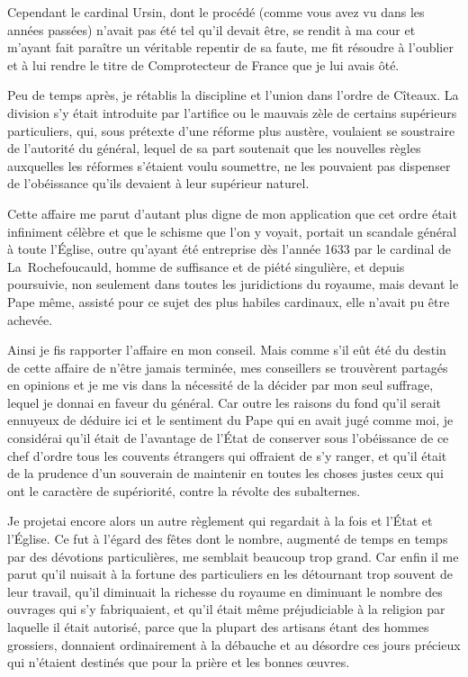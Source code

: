 \documentclass[french,twoside]{book} %
\begin{document}
Cependant le cardinal Ursin, dont le procédé (comme vous avez vu dans les années passées) n’avait pas été tel qu’il devait être, se rendit à ma cour et m’ayant fait paraître un véritable repentir de sa faute, me fit résoudre à l’oublier et à lui rendre le titre de Comprotecteur de France que je lui avais ôté.\par
Peu de temps après, je rétablis la discipline et l’union dans l’ordre de Cîteaux. La division s’y était introduite par l’artifice ou le mauvais zèle de certains supérieurs particuliers, qui, sous prétexte d’une réforme plus austère, voulaient se soustraire de l’autorité du général, lequel de sa part soutenait que les nouvelles règles auxquelles les réformes s’étaient voulu soumettre, ne les pouvaient pas dispenser de l’obéissance qu’ils devaient à leur supérieur naturel.\par
Cette affaire me parut d’autant plus digne de mon application que cet ordre était infiniment célèbre et que le schisme que l’on y voyait, portait un scandale général à toute l’Église, outre qu’ayant été entreprise dès l’année 1633 par le cardinal de La Rochefoucauld, homme de suffisance et de piété singulière, et depuis poursuivie, non seulement dans toutes les juridictions du royaume, mais devant le Pape même, assisté pour ce sujet des plus habiles cardinaux, elle n’avait pu être achevée.\par
Ainsi je fis rapporter l’affaire en mon conseil. Mais comme s’il eût été du destin de cette affaire de n’être jamais terminée, mes conseillers se trouvèrent partagés en opinions et je me vis dans la nécessité de la décider par mon seul suffrage, lequel je donnai en faveur du général. Car outre les raisons du fond qu’il serait ennuyeux de déduire ici et le sentiment du Pape qui en avait jugé comme moi, je considérai qu’il était de l’avantage de l’État de conserver sous l’obéissance de ce chef d’ordre tous les couvents étrangers qui offraient de s’y ranger, et qu’il était de la prudence d’un souverain de maintenir en toutes les choses justes ceux qui ont le caractère de supériorité, contre la révolte des subalternes.\par
Je projetai encore alors un autre règlement qui regardait à la fois et l’État et l’Église. Ce fut à l’égard des fêtes dont le nombre, augmenté de temps en temps par des dévotions particulières, me semblait beaucoup trop grand. Car enfin il me parut qu’il nuisait à la fortune des particuliers en les détournant trop souvent de leur travail, qu’il diminuait la richesse du royaume en diminuant le nombre des ouvrages qui s’y fabriquaient, et qu’il était même préjudiciable à la religion par laquelle il était autorisé, parce que la plupart des artisans étant des hommes grossiers, donnaient ordinairement à la débauche et au désordre ces jours précieux qui n’étaient destinés que pour la prière et les bonnes œuvres.\par
\end{document}

